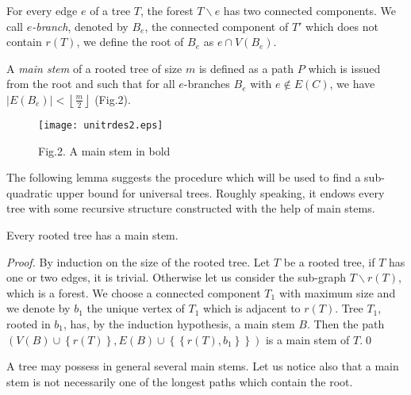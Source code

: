 \documentclass{llncs}
\begin{document}
For every edge $e$ of a tree $T$, the forest $T\backslash e$ has two connected
components. We call $e$\textit{-branch}, denoted by $B_e $, the connected component of
${T}'$ which does not contain $r\left( T \right)$, we define the root of
$B_e $ as $e \cap V\left( {B_e } \right).$

A\textit{ main stem }of a rooted tree of size $m$ is defined as a
path $P$ which is issued from the root and such that for all
$e$-branches $B_e $ with $e \notin E\left( C \right)$, we have
$\left| {E\left( {B_e } \right)} \right| < \left\lfloor
{\frac{m}{2}} \right\rfloor $ (Fig.2).

\begin{figure}[htbp]
\centerline{\texttt{[image: unitrdes2.eps]}}
\label{fig2}
\begin{center}
Fig.2. A main stem in bold
\end{center}
\end{figure}



The following lemma suggests the procedure which will be used to find a
sub-quadratic upper bound for universal trees. Roughly speaking, it endows
every tree with some recursive structure constructed with the help of main
stems.





\begin{lemma} Every rooted tree has a main stem.
\end{lemma}




\begin{proof}By induction on the size of the rooted tree. Let $T$ be a rooted tree, if $T$ has
one or two edges, it is trivial. Otherwise let us consider the
sub-graph $T\backslash r\left( T \right)$, which is a forest. We
choose a connected component $T_1 $ with maximum size and we
denote by $b_1 $ the unique vertex of $T_1$ which is adjacent to
$r(T)$. Tree $T_1 $, rooted in $b_1 $, has, by the induction
hypothesis, a main stem $B.$ Then the path $\left( {V\left( B
\right) \cup \left\{ {r\left( T \right)} \right\},E\left( B
\right) \cup \left\{ {\left\{ {r\left( T \right),b_1 } \right\}}
\right\}} \right)$ is a main stem of $T$.\qed
\end{proof}





\begin{remark} A tree may possess in general several main stems. Let
us notice also that a main stem is not necessarily one of the
longest paths which contain the root.
\end{remark}
\end{document}

